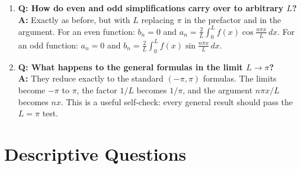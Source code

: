 \documentclass[12pt,a4paper]{article}
\begin{document}
\begin{enumerate}[leftmargin=*]
\item \textbf{Q: How do even and odd simplifications carry over to arbitrary $L$?}\\
\textbf{A:} Exactly as before, but with $L$ replacing $\pi$ in the prefactor and in the argument.
For an even function: $b_n = 0$ and $a_n = \frac{2}{L}\int_0^L f(x)\cos\frac{n\pi x}{L}\,dx$.
For an odd function: $a_n = 0$ and $b_n = \frac{2}{L}\int_0^L f(x)\sin\frac{n\pi x}{L}\,dx$.

\item \textbf{Q: What happens to the general formulas in the limit $L \to \pi$?}\\
\textbf{A:} They reduce exactly to the standard $(-\pi,\pi)$ formulas.
The limits become $-\pi$ to $\pi$, the factor $1/L$ becomes $1/\pi$, and the argument $n\pi x/L$ becomes $nx$.
This is a useful self-check: every general result should pass the $L=\pi$ test.

\end{enumerate}

\section{Descriptive Questions}
\end{document}
